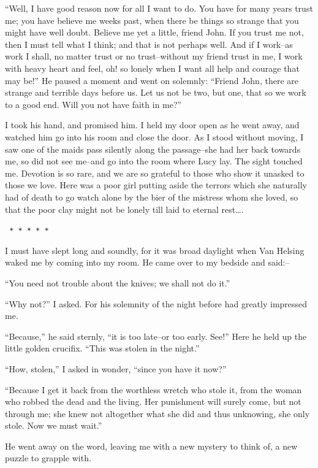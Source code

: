\documentclass[12pt,openright]{book}
\begin{document}
“Well, I have good reason now for all I want to do. You have for many years trust me; you have believe me weeks past, when there be things so strange that you might have well doubt. Believe me yet a little, friend John. If you trust me not, then I must tell what I think; and that is not perhaps well. And if I work–as work I shall, no matter trust or no trust–without my friend trust in me, I work with heavy heart and feel, oh! so lonely when I want all help and courage that may be!” He paused a moment and went on solemnly: “Friend John, there are strange and terrible days before us. Let us not be two, but one, that so we work to a good end. Will you not have faith in me?”

I took his hand, and promised him. I held my door open as he went away, and watched him go into his room and close the door. As I stood without moving, I saw one of the maids pass silently along the passage–she had her back towards me, so did not see me–and go into the room where Lucy lay. The sight touched me. Devotion is so rare, and we are so grateful to those who show it unasked to those we love. Here was a poor girl putting aside the terrors which she naturally had of death to go watch alone by the bier of the mistress whom she loved, so that the poor clay might not be lonely till laid to eternal rest….

\texttt{   *       *       *       *       *}

I must have slept long and soundly, for it was broad daylight when Van Helsing waked me by coming into my room. He came over to my bedside and said:–

“You need not trouble about the knives; we shall not do it.”

“Why not?” I asked. For his solemnity of the night before had greatly impressed me.

“Because,” he said sternly, “it is too late–or too early. See!” Here he held up the little golden crucifix. “This was stolen in the night.”

“How, stolen,” I asked in wonder, “since you have it now?”

“Because I get it back from the worthless wretch who stole it, from the woman who robbed the dead and the living. Her punishment will surely come, but not through me; she knew not altogether what she did and thus unknowing, she only stole. Now we must wait.”

He went away on the word, leaving me with a new mystery to think of, a new puzzle to grapple with.
\end{document}
